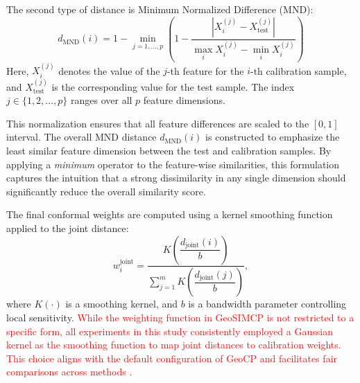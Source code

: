\documentclass[authoryear,preprint,review,12pt]{elsarticle}
\begin{document}

The second type of distance is Minimum Normalized Difference (MND):
\begin{equation}
d_{\text{MND}}(i) = 1 - \min_{j = 1, \dots, p} \left(1 - \frac{|X_i^{(j)} - X_{\text{test}}^{(j)}|}{\max_i X_i^{(j)} - \min_i X_i^{(j)}}\right)
\label{eq:mnd_direct}
\end{equation}
Here, $X_i^{(j)}$ denotes the value of the $j$-th feature for the $i$-th calibration sample, and $X_{\text{test}}^{(j)}$ is the corresponding value for the test sample. The index $j \in \{1, 2, \dots, p\}$ ranges over all $p$ feature dimensions. 

This normalization ensures that all feature differences are scaled to the $[0,1]$ interval. The overall MND distance $d_{\text{MND}}(i)$ is constructed to emphasize the least similar feature dimension between the test and calibration samples. By applying a \textit{minimum} operator to the feature-wise similarities, this formulation captures the intuition that a strong dissimilarity in any single dimension should significantly reduce the overall similarity score. 


The final conformal weights are computed using a kernel smoothing function applied to the joint distance:
\begin{equation}
w_i^{\text{joint}} = \frac{K\left( \dfrac{d_{\text{joint}}(i)}{b} \right)}{\sum_{j=1}^m K\left( \dfrac{d_{\text{joint}}(j)}{b} \right)},
\end{equation}
where $K(\cdot)$ is a smoothing kernel, and $b$ is a bandwidth parameter controlling local sensitivity. \textcolor{red}{While the weighting function in GeoSIMCP is not restricted to a specific form, all experiments in this study consistently employed a Gaussian kernel as the smoothing function to map joint distances to calibration weights. This choice aligns with the default configuration of GeoCP and facilitates fair comparisons across methods \citep{lou2025geoconformal}.}
\end{document}
